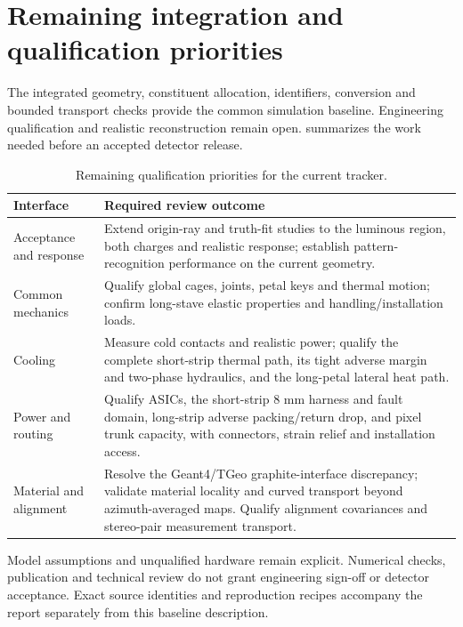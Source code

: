 \section{Remaining integration and qualification priorities}
\label{sec:tracker-review}
The integrated geometry, constituent allocation, identifiers, conversion and
bounded transport checks provide the common simulation baseline. Engineering
qualification and realistic reconstruction remain open. 
summarizes the work needed before an accepted detector release.

\begin{table}[!htbp]
\centering\small
\caption{Remaining qualification priorities for the current tracker.}
\label{tab:tracker-review}
\begin{tabular}{@{}>{\raggedright\arraybackslash}p{34mm}>{\raggedright\arraybackslash}p{106mm}@{}}\toprule
Interface & Required review outcome\\\midrule
Acceptance and response & Extend origin-ray and truth-fit studies to the luminous
region, both charges and realistic response; establish pattern-recognition
performance on the current geometry.\\
Common mechanics & Qualify global cages, joints, petal keys and thermal motion;
confirm long-stave elastic properties and handling/installation loads.\\
Cooling & Measure cold contacts and realistic power; qualify the complete
short-strip thermal path, its tight adverse margin and two-phase hydraulics,
and the long-petal lateral heat path.\\
Power and routing & Qualify ASICs, the short-strip 8 mm harness and fault domain,
long-strip adverse packing/return drop, and pixel trunk capacity, with connectors,
strain relief and installation access.\\
Material and alignment & Resolve the Geant4/TGeo graphite-interface discrepancy;
validate material locality and curved transport beyond azimuth-averaged maps.
Qualify alignment covariances and stereo-pair measurement transport.\\\bottomrule
\end{tabular}
\end{table}

Model assumptions and unqualified hardware remain explicit. Numerical checks,
publication and technical review do not grant engineering sign-off or detector
acceptance. Exact source identities and reproduction recipes accompany the
report separately from this baseline description.
